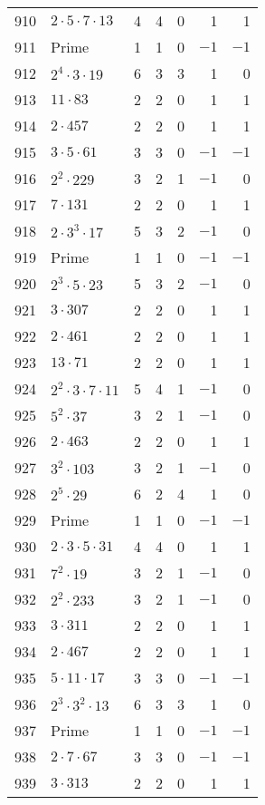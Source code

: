 \documentclass[12pt]{article}
\begin{document}
\begin{tabular}{|r|l|r|r|r|r|r|}
910 & $2 \cdot 5 \cdot 7 \cdot 13$ & 4 & 4 & 0 & 1 & 1 \\
911 & Prime & 1 & 1 & 0 & $-1$ & $-1$ \\
912 & $2^4 \cdot 3 \cdot 19$ & 6 & 3 & 3 & 1 & 0 \\
913 & $11 \cdot 83$ & 2 & 2 & 0 & 1 & 1 \\
914 & $2 \cdot 457$ & 2 & 2 & 0 & 1 & 1 \\
915 & $3 \cdot 5 \cdot 61$ & 3 & 3 & 0 & $-1$ & $-1$ \\
916 & $2^2 \cdot 229$ & 3 & 2 & 1 & $-1$ & 0 \\
917 & $7 \cdot 131$ & 2 & 2 & 0 & 1 & 1 \\
918 & $2 \cdot 3^3 \cdot 17$ & 5 & 3 & 2 & $-1$ & 0 \\
919 & Prime & 1 & 1 & 0 & $-1$ & $-1$ \\
920 & $2^3 \cdot 5 \cdot 23$ & 5 & 3 & 2 & $-1$ & 0 \\
921 & $3 \cdot 307$ & 2 & 2 & 0 & 1 & 1 \\
922 & $2 \cdot 461$ & 2 & 2 & 0 & 1 & 1 \\
923 & $13 \cdot 71$ & 2 & 2 & 0 & 1 & 1 \\
924 & $2^2 \cdot 3 \cdot 7 \cdot 11$ & 5 & 4 & 1 & $-1$ & 0 \\
925 & $5^2 \cdot 37$ & 3 & 2 & 1 & $-1$ & 0 \\
926 & $2 \cdot 463$ & 2 & 2 & 0 & 1 & 1 \\
927 & $3^2 \cdot 103$ & 3 & 2 & 1 & $-1$ & 0 \\
928 & $2^5 \cdot 29$ & 6 & 2 & 4 & 1 & 0 \\
929 & Prime & 1 & 1 & 0 & $-1$ & $-1$ \\
930 & $2 \cdot 3 \cdot 5 \cdot 31$ & 4 & 4 & 0 & 1 & 1 \\
931 & $7^2 \cdot 19$ & 3 & 2 & 1 & $-1$ & 0 \\
932 & $2^2 \cdot 233$ & 3 & 2 & 1 & $-1$ & 0 \\
933 & $3 \cdot 311$ & 2 & 2 & 0 & 1 & 1 \\
934 & $2 \cdot 467$ & 2 & 2 & 0 & 1 & 1 \\
935 & $5 \cdot 11 \cdot 17$ & 3 & 3 & 0 & $-1$ & $-1$ \\
936 & $2^3 \cdot 3^2 \cdot 13$ & 6 & 3 & 3 & 1 & 0 \\
937 & Prime & 1 & 1 & 0 & $-1$ & $-1$ \\
938 & $2 \cdot 7 \cdot 67$ & 3 & 3 & 0 & $-1$ & $-1$ \\
939 & $3 \cdot 313$ & 2 & 2 & 0 & 1 & 1 \\

\end{tabular}
\end{document}
